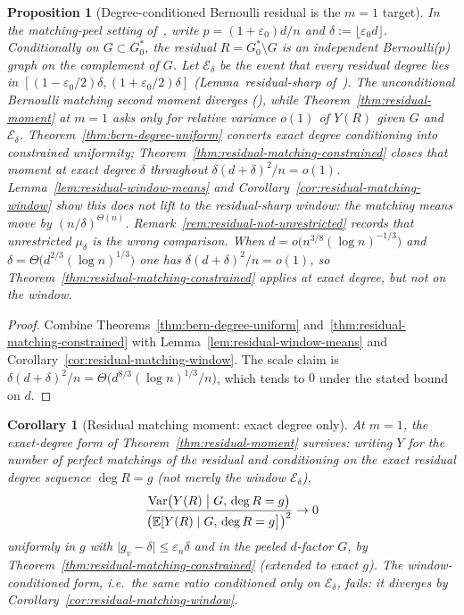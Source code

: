 \documentclass[11pt]{article}
\newtheorem{corollary}[theorem]{Corollary}
\newtheorem{proposition}[theorem]{Proposition}
\newcommand{\EE}{\mathbb{E}}
\newcommand{\Var}{\mathrm{Var}}
\begin{document}
\begin{proposition}[Degree-conditioned Bernoulli residual is the \(m=1\) target]
\label{prop:residual-degree-conditioned}
In the matching-peel setting of~\cite{PlusOneV1}, write
\(p=(1+\varepsilon_0)d/n\) and \(\delta:=\lfloor\varepsilon_0 d\rfloor\). Conditionally on
\(G\subset G^*_0\), the residual \(R=G^*_0\setminus G\) is an independent
Bernoulli(\(p\)) graph on the complement of \(G\). Let \(\mathcal E_\delta\) be the
event that every residual degree lies in
\([(1-\varepsilon_0/2)\delta,(1+\varepsilon_0/2)\delta]\)
(Lemma~residual-sharp of~\cite{PlusOneV1}). The unconditional Bernoulli
matching second moment diverges
(\cite[Proposition~bernoulli-moment]{PlusOneV1}), while
Theorem~\ref{thm:residual-moment} at \(m=1\) asks only for relative variance
\(o(1)\) of \(Y(R)\) given \(G\) and \(\mathcal E_\delta\).
Theorem~\ref{thm:bern-degree-uniform} converts exact degree conditioning into
constrained uniformity; Theorem~\ref{thm:residual-matching-constrained} closes
that moment at exact degree \(\delta\) throughout
\(\delta(d+\delta)^2/n=o(1)\). Lemma~\ref{lem:residual-window-means} and
Corollary~\ref{cor:residual-matching-window} show this does \emph{not} lift to
the residual-sharp window: the matching means move by \((n/\delta)^{\Theta(n)}\).
Remark~\ref{rem:residual-not-unrestricted} records that
unrestricted \(\mu_\delta\) is the wrong comparison.
When \(d=o\bigl(n^{3/8}(\log n)^{-1/3}\bigr)\) and
\(\delta=\Theta\bigl(d^{2/3}(\log n)^{1/3}\bigr)\) one has
\(\delta(d+\delta)^2/n=o(1)\), so Theorem~\ref{thm:residual-matching-constrained} applies at
exact degree, but not on the window.
\end{proposition}

\begin{proof}
Combine Theorems~\ref{thm:bern-degree-uniform}
and~\ref{thm:residual-matching-constrained} with
Lemma~\ref{lem:residual-window-means} and
Corollary~\ref{cor:residual-matching-window}.
The scale claim is
\(\delta(d+\delta)^2/n=\Theta\bigl(d^{8/3}(\log n)^{1/3}/n\bigr)\), which tends
to \(0\) under the stated bound on \(d\).
\end{proof}

\begin{corollary}[Residual matching moment: exact degree only]
\label{thm:residual-moment-m1}
At \(m=1\), the exact-degree form of Theorem~\ref{thm:residual-moment} survives:
writing \(Y\) for the number of perfect matchings of the residual and conditioning on
the exact residual degree sequence \(\deg R=g\) (not merely the window \(\mathcal E_\delta\)),
\[
\frac{\Var\bigl(Y(R)\bigm|G,\,\deg R=g\bigr)}
{\bigl(\EE[Y(R)\mid G,\,\deg R=g\bigr]\bigr)^2}
\to0
\]
uniformly in \(g\) with \(\lvert g_v-\delta\rvert\le\varepsilon_n\delta\) and in the peeled
\(d\)-factor \(G\), by Theorem~\ref{thm:residual-matching-constrained} (extended to exact \(g\)).
The window-conditioned form, i.e.\ the same ratio conditioned only on \(\mathcal E_\delta\),
\emph{fails}: it diverges by Corollary~\ref{cor:residual-matching-window}.
\end{corollary}
\end{document}
